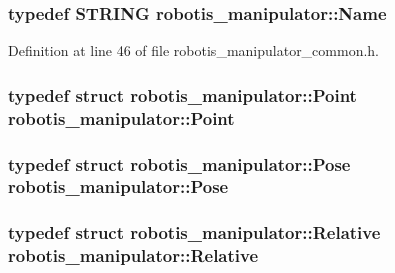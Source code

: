 \subsubsection[{\texorpdfstring{Name}{Name}}]{\setlength{\rightskip}{0pt plus 5cm}typedef {\bf S\+T\+R\+I\+NG} {\bf robotis\+\_\+manipulator\+::\+Name}}\hypertarget{namespacerobotis__manipulator_a08c2d25e77a01ad75b9bb740f8ce4765}{}\label{namespacerobotis__manipulator_a08c2d25e77a01ad75b9bb740f8ce4765}


Definition at line 46 of file robotis\+\_\+manipulator\+\_\+common.\+h.

\subsubsection[{\texorpdfstring{Point}{Point}}]{\setlength{\rightskip}{0pt plus 5cm}typedef struct {\bf robotis\+\_\+manipulator\+::\+Point}  {\bf robotis\+\_\+manipulator\+::\+Point}}\hypertarget{namespacerobotis__manipulator_a14f99d40e3de0c0cc881b0b94504f99e}{}\label{namespacerobotis__manipulator_a14f99d40e3de0c0cc881b0b94504f99e}
\subsubsection[{\texorpdfstring{Pose}{Pose}}]{\setlength{\rightskip}{0pt plus 5cm}typedef struct {\bf robotis\+\_\+manipulator\+::\+Pose}  {\bf robotis\+\_\+manipulator\+::\+Pose}}\hypertarget{namespacerobotis__manipulator_a5934a151815a32d76af3af3bfe6e5be8}{}\label{namespacerobotis__manipulator_a5934a151815a32d76af3af3bfe6e5be8}
\subsubsection[{\texorpdfstring{Relative}{Relative}}]{\setlength{\rightskip}{0pt plus 5cm}typedef struct {\bf robotis\+\_\+manipulator\+::\+Relative}  {\bf robotis\+\_\+manipulator\+::\+Relative}}\hypertarget{namespacerobotis__manipulator_a62c82d0cc8d649345afd30cb34b32dd8}{}\label{namespacerobotis__manipulator_a62c82d0cc8d649345afd30cb34b32dd8}
